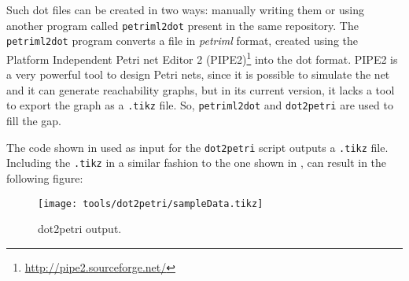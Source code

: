 Such dot files can be created in two ways: manually writing them or using
another program called \verb|petriml2dot| present in the same repository. The
\verb|petriml2dot| program converts a file in \emph{petriml} format, created using the Platform Independent Petri
net Editor 2 (PIPE2)\footnote{\url{http://pipe2.sourceforge.net/}} into the dot
format.
PIPE2 is a very powerful tool to design Petri nets, since it is possible to simulate the
net and it can generate reachability graphs, but in its current version, it
lacks a tool to export the graph as a \verb|.tikz| file. So,
\verb|petriml2dot| and \verb|dot2petri| are used to fill the gap.

The code shown in  used as input for the
\verb|dot2petri| script outputs a \verb|.tikz| file. Including the \verb|.tikz| in a similar fashion
to the one shown in , can result in the following figure:
\begin{figure}[H]
  \centering
  \texttt{[image: tools/dot2petri/sampleData.tikz]}
  \caption{dot2petri output.}
  \label{fig:Dot2automataSampleOutput}
\end{figure}



